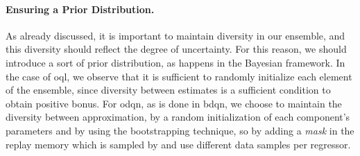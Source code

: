 \paragraph{Ensuring a Prior Distribution.} As already discussed, it is important to maintain diversity in our ensemble, and this diversity should reflect the degree of uncertainty. For this reason, we should introduce a sort of prior distribution, as happens in the Bayesian framework. In the case of \gls{oql}, we observe that it is sufficient to randomly initialize each element of the ensemble, since diversity between estimates is a sufficient condition to obtain positive bonus.
For \gls{odqn}, as is done in \gls{bdqn}, we choose to maintain the diversity between approximation, by a random initialization of each component's parameters and by using the bootstrapping technique, so by adding a \textsl{mask} in the replay memory which is sampled by  and use different data samples per regressor.

